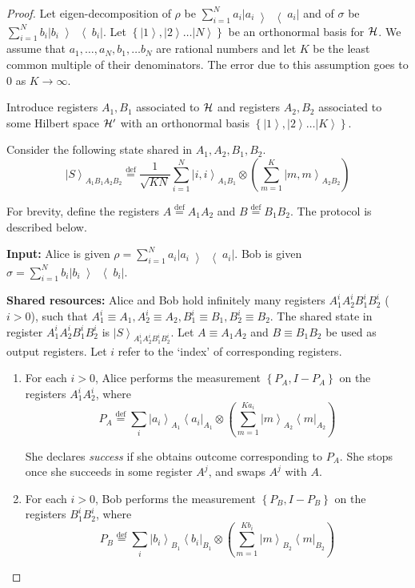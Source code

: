 \documentclass[11pt,a4paper]{article}
\def\H{\CMcal{H}}
\theoremstyle{plain}
\theoremstyle{definition}
\newcommand {\defeq} {\ensuremath{ \stackrel{\mathrm{def}}{=} }}
\newcommand {\bra} [1] {\ensuremath{ \left\langle #1 \right| }}
\newcommand {\ket} [1] {\ensuremath{ \left| #1 \right\rangle }}
\newcommand {\ketbratwo} [2] {\ensuremath{ \left| #1 \middle\rangle \middle\langle #2 \right| }}
\newcommand {\ketbra} [1] {\ketbratwo{#1}{#1}}
\newcommand {\set} [1] {\ensuremath{ \left\lbrace #1 \right\rbrace }}
\begin{document}
\begin{proof}
Let eigen-decomposition of $\rho$ be $\sum_{i=1}^Na_i\ketbra{a_i}$ and of $\sigma$ be $\sum_{i=1}^Nb_i\ketbra{b_i}$. Let $\set{\ket{1},\ket{2}\ldots \ket{N}}$ be an orthonormal basis for $\H$. We assume that $a_1, \ldots, a_N, b_1,  \ldots b_N$ are rational numbers and let $K$ be the least common multiple of their denominators. The error due to this assumption goes to $0$ as $K \rightarrow \infty$. 

Introduce registers $A_1,B_1$ associated to $\H$ and registers $A_2,B_2$ associated to some Hilbert space $\H'$ with an orthonormal basis $\set{\ket{1},\ket{2}\ldots \ket{K}}$.
 
Consider the following state shared in $A_1,A_2,B_1,B_2$.
\begin{equation*}
\ket{S}_{A_1B_1A_2B_2} \defeq \frac{1}{\sqrt{KN}}\sum_{i=1}^N \ket{i,i}_{A_1B_1} \otimes \left(\sum_{m=1}^{K}\ket{m, m}_{A_2B_2} \right)
\end{equation*}

 For brevity, define the registers $A\defeq A_1A_2$ and $B \defeq B_1B_2$. The protocol is described below.
\begin{mdframed}
\bigskip
\textbf{Input:} Alice is given $\rho=\sum_{i=1}^Na_i\ketbra{a_i}$. Bob is given $\sigma=\sum_{i=1}^Nb_i\ketbra{b_i}$.
\bigskip

\textbf{Shared resources:} Alice and Bob hold infinitely many registers $A_1^iA_2^iB_1^iB_2^i$ ($i>0$), such that $A_1^i\equiv A_1, A^i_2\equiv A_2, B_1^i\equiv B_1,B_2^i\equiv B_2$. The shared state in register $A_1^iA_2^iB_1^iB_2^i$ is $\ket{S}_{A_1^iA_2^iB_1^iB_2^i}$. Let $A \equiv A_1A_2$ and $B\equiv B_1B_2$ be used as output registers. Let $i$ refer to the `index' of corresponding registers.

\begin{enumerate}

\item For each $i>0$, Alice performs the measurement $\set{P_A,I- P_A}$ on the registers $A^i_1A^i_2$, where
\begin{equation*}
P_A\defeq\sum_i\ket{a_i}_{A_1}\bra{a_i}_{A_1}\otimes \left(\sum_{m=1}^{Ka_i}\ket{m}_{A_2}\bra{m}_{A_2}\right)
\end{equation*}

She declares \textit{success} if she obtains outcome corresponding to $P_A$. She stops once she succeeds in some register $A^j$, and swaps $A^j$ with $A$. 

\item For each $i>0$, Bob performs the measurement $\set{P_B,I- P_B}$ on the registers $B^i_1B^i_2$, where
\begin{equation*}
P_B\defeq\sum_i\ket{b_i}_{B_1}\bra{b_i}_{B_1}\otimes \left(\sum_{m=1}^{Kb_i}\ket{m}_{B_2}\bra{m}_{B_2}\right)
\end{equation*}


\end{enumerate}
\end{mdframed}
\end{proof}
\end{document}
